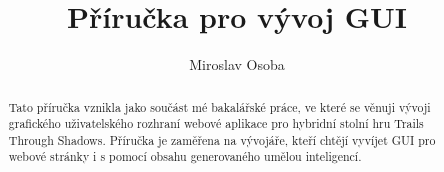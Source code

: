 \documentclass[12pt,a4paper]{article}
\title{Příručka pro vývoj GUI}
\author{Miroslav Osoba}
\begin{document}
\maketitle %

\begin{abstract}
  Tato příručka vznikla jako součást mé bakalářské práce, ve které se věnuji vývoji grafického uživatelského rozhraní webové aplikace pro hybridní stolní hru Trails Through Shadows. Příručka je zaměřena na vývojáře, kteří chtějí vyvíjet GUI pro webové stránky i s pomocí obsahu generovaného umělou inteligencí.
\end{abstract}

\tableofcontents %

\newpage

\end{document}
